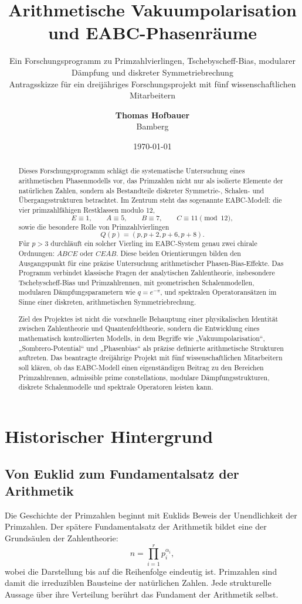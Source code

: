 \documentclass[11pt,a4paper,bibliography=totoc]{scrartcl}
\title{\textsf{Arithmetische Vakuumpolarisation und EABC-Phasenräume}}
\subtitle{Ein Forschungsprogramm zu Primzahlvierlingen, Tschebyscheff-Bias, modularer Dämpfung und diskreter Symmetriebrechung \\ \vspace{0.5em} \large Antragsskizze für ein dreijähriges Forschungsprojekt mit fünf wissenschaftlichen Mitarbeitern}
\author{\textbf{Thomas Hofbauer} \\ Bamberg}
\date{\today}
\begin{document}
\maketitle

\begin{abstract}
\noindent Dieses Forschungsprogramm schlägt die systematische Untersuchung eines arithmetischen Phasenmodells vor, das Primzahlen nicht nur als isolierte Elemente der natürlichen Zahlen, sondern als Bestandteile diskreter Symmetrie-, Schalen- und Übergangsstrukturen betrachtet. Im Zentrum steht das sogenannte EABC-Modell: die vier primzahlfähigen Restklassen modulo 12,
\[
E \equiv 1, \qquad A \equiv 5, \qquad B \equiv 7, \qquad C \equiv 11 \pmod{12},
\]
sowie die besondere Rolle von Primzahlvierlingen
\[
Q(p) = (p, p+2, p+6, p+8).
\]
Für $p > 3$ durchläuft ein solcher Vierling im EABC-System genau zwei chirale Ordnungen: $ABCE$ oder $CEAB$. Diese beiden Orientierungen bilden den Ausgangspunkt für eine präzise Untersuchung arithmetischer Phasen-Bias-Effekte. Das Programm verbindet klassische Fragen der analytischen Zahlentheorie, insbesondere Tschebyscheff-Bias und Primzahlrennen, mit geometrischen Schalenmodellen, modularen Dämpfungsparametern wie $q = e^{-\pi}$, und spektralen Operatoransätzen im Sinne einer diskreten, arithmetischen Symmetriebrechung.

Ziel des Projektes ist nicht die vorschnelle Behauptung einer physikalischen Identität zwischen Zahlentheorie und Quantenfeldtheorie, sondern die Entwicklung eines mathematisch kontrollierten Modells, in dem Begriffe wie „Vakuumpolarisation“, „Sombrero-Potential“ und „Phasenbias“ als präzise definierte arithmetische Strukturen auftreten. Das beantragte dreijährige Projekt mit fünf wissenschaftlichen Mitarbeitern soll klären, ob das EABC-Modell einen eigenständigen Beitrag zu den Bereichen Primzahlrennen, admissible prime constellations, modulare Dämpfungsstrukturen, diskrete Schalenmodelle und spektrale Operatoren leisten kann.
\end{abstract}

\tableofcontents
\vfill
\newpage

\section{Historischer Hintergrund}

\subsection{Von Euklid zum Fundamentalsatz der Arithmetik}
Die Geschichte der Primzahlen beginnt mit Euklids Beweis der Unendlichkeit der Primzahlen. Der spätere Fundamentalsatz der Arithmetik bildet eine der Grundsäulen der Zahlentheorie:
\[
n = \prod_{i=1}^{r} p_i^{\alpha_i},
\]
wobei die Darstellung bis auf die Reihenfolge eindeutig ist. Primzahlen sind damit die irreduziblen Bausteine der natürlichen Zahlen. Jede strukturelle Aussage über ihre Verteilung berührt das Fundament der Arithmetik selbst.
\end{document}
